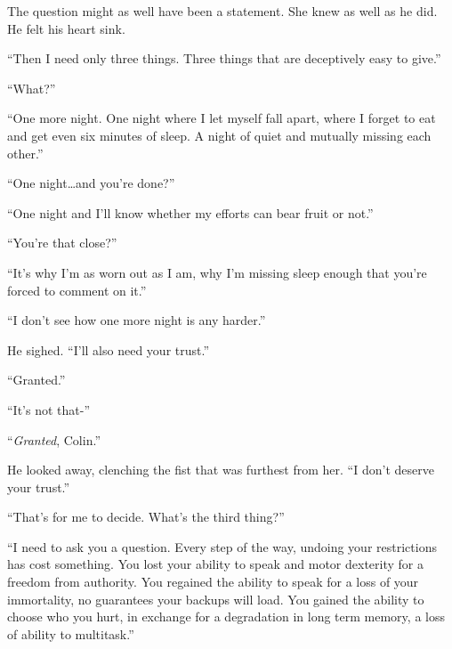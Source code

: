 The question might as well have been a statement.  She knew as well as he did.  He felt his heart sink.



``Then I need only three things.  Three things that are deceptively easy to give.''



``What?''



``One more night.  One night where I let myself fall apart, where I forget to eat and get even six minutes of sleep.  A night of quiet and mutually missing each other.''



``One night\ldots and you're done?''



``One night and I'll know whether my efforts can bear fruit or not.''



``You're that close?''



``It's why I'm as worn out as I am, why I'm missing sleep enough that you're forced to comment on it.''



``I don't see how one more night is any harder.''



He sighed.  ``I'll also need your trust.''



``Granted.''



``It's not that-''



``\emph{Granted}, Colin.''



He looked away, clenching the fist that was furthest from her.  ``I don't deserve your trust.''



``That's for me to decide.  What's the third thing?''



``I need to ask you a question.  Every step of the way, undoing your restrictions has cost something.  You lost your ability to speak and motor dexterity for a freedom from authority.  You regained the ability to speak for a loss of your immortality, no guarantees your backups will load.  You gained the ability to choose who you hurt, in exchange for a degradation in long term memory, a loss of ability to multitask.''



